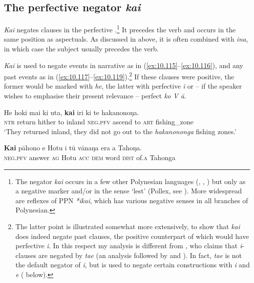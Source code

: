 \subsection{The perfective negator \textit{kai}}\label{sec:10.5.3}

\textit{Kai} negates clauses in the perfective .\footnote{\label{fn:497}The negator \textit{kai} occurs in a few other Polynesian languages (, , ) but only as a negative  marker and/or in the sense ‘lest’ (Pollex, see \citealt{GreenhillClark2011}). More widespread are reflexes of PPN \textit{*{\ꞌ}ikai}, which has various negative senses in all branches of Polynesian.} It precedes the verb and occurs in the same position as aspectuals. As discussed in  above, it is often combined with \textit{{\ꞌ}ina}, in which case the subject usually precedes the verb. 

\textit{Kai} is used to negate events in narrative as in (\ref{ex:10.115}–\ref{ex:10.116}), and any past events as in (\ref{ex:10.117}–\ref{ex:10.119}).\footnote{\label{fn:498}The latter point is illustrated somewhat more extensively, to show that \textit{kai} does indeed negate past  clauses, the positive counterpart of which would have perfective \textit{i}. In this respect my analysis is different from \citet[79]{Englert1978}, who claims that \textit{i}{}-clauses are negated by \textit{ta{\ꞌ}e} (an analysis followed by \citealt[158]{Chapin1978} and \citealt[157]{Stenson1981}). In fact, \textit{ta{\ꞌ}e} is not the default negator of \textit{i}, but is used to negate certain constructions with \textit{i} and \textit{e} ( below).} If these clauses were positive, the former would be marked with \textit{he}, the latter with perfective \textit{i} or – if the speaker wishes to emphasise their present relevance – perfect \textit{ko V {\ꞌ}ā}.

\ea\label{ex:10.115}
\gll He hoki mai ki {\ꞌ}uta, \textbf{kai} iri ki te hakanonoŋa. \\
\textsc{ntr} return hither to inland \textsc{neg.pfv} ascend to \textsc{art} fishing\_zone \\

\glt 
‘They returned inland, they did not go out to the \textit{hakanononga} fishing zones.’ \textstyleExampleref{[Ley-6-43.031]}
\z

\ea\label{ex:10.116}
\gll \textbf{Kai} pāhono e Hotu i tū vānaŋa era {\ꞌ}a Tahoŋa. \\
\textsc{neg.pfv} answer \textsc{ag} Hotu \textsc{acc} \textsc{dem} word \textsc{dist} of\textsc{.a} Tahonga \\

